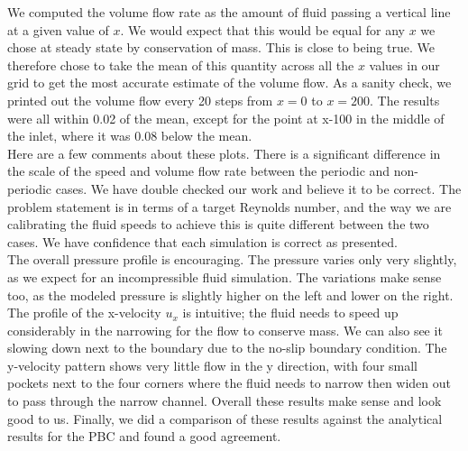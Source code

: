 We computed the volume flow rate as the amount of fluid passing a vertical line
at a given value of $x$.  We would expect that this would be equal for any $x$ 
we chose at steady state by conservation of mass.  This is close to being true.
We therefore chose to take the mean of this quantity across all the $x$ values
in our grid to get the most accurate estimate of the volume flow.
As a sanity check, we printed out the volume flow every 20 steps from $x=0$ to 
$x=200$.  The results were all within 0.02 of the mean, except for the point
at x-100 in the middle of the inlet, where it was 0.08 below the mean. \\

Here are a few comments about these plots.
There is a significant difference in the scale of the speed and volume flow rate between
the periodic and non-periodic cases.
We have double checked our work and believe it to be correct.
The problem statement is in terms of a target Reynolds number, 
and the way we are calibrating the fluid speeds to achieve this is
quite different between the two cases.
We have confidence that each simulation is correct as presented. \\

The overall pressure profile is encouraging.  
The pressure varies only very slightly, as we expect for an incompressible fluid simulation.
The variations make sense too, as the modeled pressure is slightly higher on
the left and lower on the right.
The profile of the x-velocity $u_x$ is intuitive; the fluid needs to speed up
considerably in the narrowing for the flow to conserve mass.
We can also see it slowing down next to the boundary due to the 
no-slip boundary condition.
The y-velocity pattern shows very little flow in the y direction,
with four small pockets next to the four corners where the fluid
needs to narrow then widen out to pass through the narrow channel.
Overall these results make sense and look good to us.
Finally, we did a comparison of these results against the analytical
results for the PBC and found a good agreement.